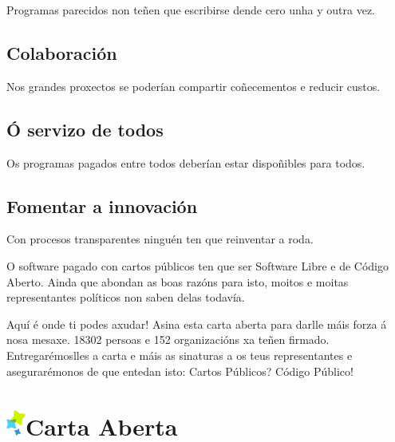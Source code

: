 \documentclass[10pt,foldmark,tumble]{leaflet}
\begin{document}
Programas parecidos non teñen que escribirse dende cero unha y outra vez.

\subsection{Colaboración}

Nos grandes proxectos se poderían compartir coñecementos e reducir custos.

\subsection{Ó servizo de todos}

Os programas pagados entre todos deberían estar dispoñibles para todos.

\subsection{Fomentar a innovación}

Con procesos transparentes ninguén ten que reinventar a roda.

\vspace{1em}

O software pagado con cartos públicos ten que ser Software Libre e de Código Aberto. Ainda que abondan as boas razóns para isto, moitos e moitas representantes políticos non saben delas todavía.

\vspace{2em}

\begin{mdframed}[style=MyFrame]
\end{mdframed}


\vspace{2em}

Aquí é onde ti podes axudar! Asina esta carta aberta para darlle máis forza á nosa mesaxe. 18302 persoas e 152 organizacións xa teñen firmado. Entregarémoslles a carta e máis as sinaturas a os teus representantes e asegurarémonos de que entedan isto: Cartos Públicos? Código Público!



\section{\includegraphics{item.png}Carta Aberta}
\end{document}
